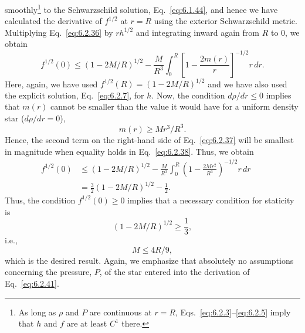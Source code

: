 smoothly\footnote{As long as \(\rho\) and \(P\) are continuous at \(r=R\),
Eqs.~\eqref{eq:6.2.3}--\eqref{eq:6.2.5} imply that \(h\) and \(f\) are at least
\(C^1\) there.} to the Schwarzschild solution, Eq.~\eqref{eq:6.1.44}, and
hence we have calculated the derivative of \(f^{1/2}\) at \(r=R\) using the
exterior Schwarzschild metric. Multiplying Eq.~\eqref{eq:6.2.36} by
\(rh^{1/2}\) and integrating inward again from \(R\) to \(0\), we obtain
\begin{equation}
  f^{1/2}(0)\leq(1-2M/R)^{1/2}
    -\frac{M}{R^3}\int_0^R
      \left[1-\frac{2m(r)}{r}\right]^{-1/2}r\,dr.
  \tag{6.2.37}\label{eq:6.2.37}
\end{equation}
Here, again, we have used \(f^{1/2}(R)=(1-2M/R)^{1/2}\) and we have also used
the explicit solution, Eq.~\eqref{eq:6.2.7}, for \(h\). Now, the condition
\(d\rho/dr\leq0\) implies that \(m(r)\) cannot be smaller than the value it would
have for a uniform density star (\(d\rho/dr=0\)),
\begin{equation}
  m(r)\geq Mr^3/R^3.
  \tag{6.2.38}\label{eq:6.2.38}
\end{equation}
Hence, the second term on the right-hand side of Eq.~\eqref{eq:6.2.37} will be
smallest in magnitude when equality holds in Eq.~\eqref{eq:6.2.38}. Thus, we
obtain
\begin{align}
  f^{1/2}(0)
    &\leq(1-2M/R)^{1/2}
       -\frac{M}{R^3}\int_0^R
         \left(1-\frac{2Mr^2}{R^3}\right)^{-1/2}r\,dr\nonumber\\
    &=\frac32(1-2M/R)^{1/2}-\frac12.
  &&\tag{6.2.39}\label{eq:6.2.39}
\end{align}
Thus, the condition \(f^{1/2}(0)\geq0\) implies that a necessary condition for
staticity is
\begin{equation}
  (1-2M/R)^{1/2}\geq\frac13,
  \tag{6.2.40}\label{eq:6.2.40}
\end{equation}
i.e.,
\begin{equation}
  M\leq4R/9,
  \tag{6.2.41}\label{eq:6.2.41}
\end{equation}
which is the desired result. Again, we emphasize that absolutely no assumptions
concerning the pressure, \(P\), of the star entered into the derivation of
Eq.~\eqref{eq:6.2.41}.

